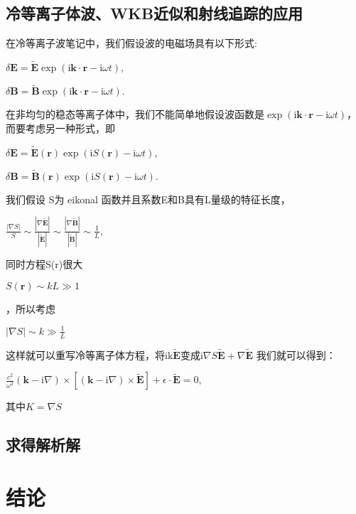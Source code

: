 \documentclass[12pt, a4paper, oneside]{ctexart}
\begin{document}
\begin{spacing}{2.0}
\subsection{冷等离子体波、WKB近似和射线追踪的应用}
在冷等离子波笔记中，我们假设波的电磁场具有以下形式:
\begin{center}
    $\displaystyle \delta\mathbf{E}=\tilde{\mathbf{E}}\exp(\text{i}\mathbf{k}\cdot\mathbf{r}-\text{i}\omega t),$
\end{center}
\begin{center}
    $\displaystyle \delta\mathbf{B}=\tilde{\mathbf{B}}\exp(\text{i}\mathbf{k}\cdot\mathbf{r}-\text{i}\omega t).$
\end{center}
在非均匀的稳态等离子体中，我们不能简单地假设波函数是$\displaystyle \exp(\text{i}\mathbf{k}\cdot\mathbf{r}-\text{i}\omega t)$，
而要考虑另一种形式，即
\begin{center}
    $\displaystyle\delta\mathbf{E}=\tilde{\mathbf{E}}(\mathbf{r})\exp(\mathrm{i}S(\mathbf{r})-\mathrm{i}\omega t),$
\end{center}
\begin{center}
    $\displaystyle \delta\mathbf{B}=\tilde{\mathbf{B}}(\mathbf{r})\exp(\mathrm{i}S(\mathbf{r})-\mathrm{i}\omega t).$
\end{center}
我们假设 S为 eikonal 函数\cite{DETRIXHE201346}并且系数E和B具有L量级的特征长度，

\begin{center}
    $\displaystyle \frac{|\nabla S|}{S}\sim\frac{|\nabla\tilde{\mathbf{E}}|}{|\tilde{\mathbf{E}}|}\sim\frac{|\nabla\tilde{\mathbf{B}}|}{|\tilde{\mathbf{B}}|}\sim\frac{1}{L},$
\end{center}
同时方程S(r)很大

\begin{center}
    $\displaystyle S(\mathbf{r})\sim kL \gg  1$
\end{center}
，所以考虑
\begin{center}
    $\displaystyle |\nabla S|\sim k\gg\frac{1}{L}$
\end{center}
这样就可以重写冷等离子体方程，将$\displaystyle \mathrm{ik}\tilde{\mathbf{E}}$变成$\mathrm{i}\nabla S\tilde{\mathbf{E}}+\nabla\tilde{\mathbf{E}}$
我们就可以得到：
\begin{center}
    $\displaystyle\frac{c^2}{\omega^2}(\mathbf{k}-\mathrm i\nabla)\times[(\mathbf k-\mathrm i\nabla)\times\tilde{\mathbf E}]+\epsilon\cdot\tilde{\mathbf E}=0,$
\end{center}
其中$K = \nabla S$




\subsection{求得解析解}
\subsection{}



\section{结论}



\end{spacing}{}



\end{document}
